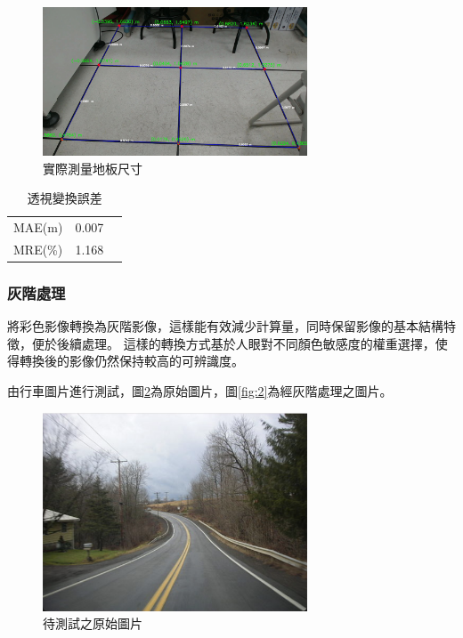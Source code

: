\documentclass[12pt]{article}       %
\begin{document}
\begin{figure}[H]
    \centering
    \includegraphics[width=0.7\textwidth]{frame_with_points_real.jpg}     %
    \caption{實際測量地板尺寸}    %
    \label{fig:frame_with_points_real}    %
\end{figure}

\begin{table}[H]
    \centering
    \caption{透視變換誤差}
    \vspace{6pt} %
    \label{tab:error_comparison}
    \begin{tabular}{lS[table-format=2.2]S[table-format=2.2]}
        \toprule
        MAE(m) & 0.007  \\
        MRE(\%) & 1.168 \\
        \bottomrule
    \end{tabular}
\end{table}

\subsubsection{灰階處理}
\hspace{2em}將彩色影像轉換為灰階影像，這樣能有效減少計算量，同時保留影像的基本結構特徵，便於後續處理。
這樣的轉換方式基於人眼對不同顏色敏感度的權重選擇，使得轉換後的影像仍然保持較高的可辨識度。

由行車圖片進行測試，圖\ref{fig:1}為原始圖片，圖\ref{fig:2}為經灰階處理之圖片。
\begin{figure}[H]
    \centering
    \includegraphics[width=0.7\textwidth]{1.png}     %
    \caption{待測試之原始圖片}    %
    \label{fig:1}    %
\end{figure}
\end{document}
